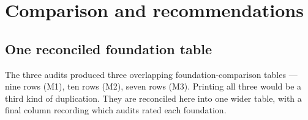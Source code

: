 \documentclass[11pt,letterpaper]{article}
\numberwithin{equation}{section}
\theoremstyle{definition}
\theoremstyle{remark}
\begin{document}
\section{Comparison and recommendations}
\label{found:sec:comparison}

\subsection{One reconciled foundation table}
\label{found:sub:foundationtable}
The three audits produced three overlapping foundation-comparison tables --- nine
rows (M1), ten rows (M2), seven rows (M3). Printing all three would be a third
kind of duplication. They are reconciled here into one wider table, with a final
column recording which audits rated each foundation.

\end{document}
